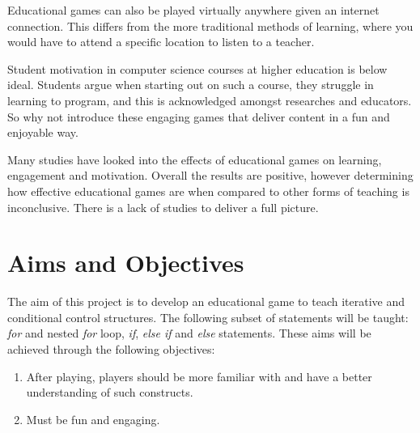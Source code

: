 \documentclass[a4paper,11.5pt]{report}
\numberwithin{figure}{section}
\numberwithin{table}{section}
\numberwithin{equation}{section}
\numberwithin{equation}{section}
\begin{document}
Educational games can also be played virtually anywhere given an internet connection. This differs from the more traditional methods of learning, where you would have to attend a specific location to listen to a teacher. 

Student motivation in computer science courses at higher education is below ideal. Students argue when starting out on such a course, they struggle in learning to program, and this is acknowledged amongst researches and educators. So why not introduce these engaging games that deliver content in a fun and enjoyable way. 

Many studies have looked into the effects of educational games on learning, engagement and motivation. Overall the results are positive, however determining how effective educational games are when compared to other forms of teaching is inconclusive. There is a lack of studies to deliver a full picture. 

\section{Aims and Objectives}


The aim of this project is to develop an educational game to teach iterative and conditional control structures. The following subset of statements will be taught: \textit{for} and nested \textit{for} loop, \textit{if}, \textit{else if} and \textit{else} statements. These aims will be achieved through the following objectives:

\begin{enumerate}
	\item After playing, players should be more familiar with and have a better understanding of such constructs. 
	\item Must be fun and engaging.
\end{enumerate}






\end{document}
